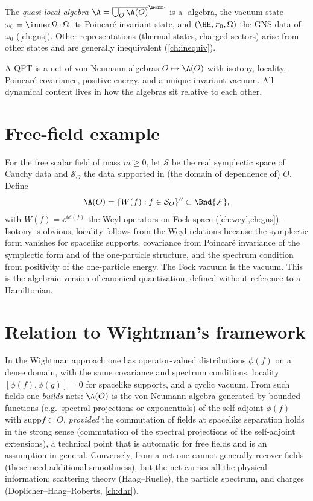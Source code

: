 The \emph{quasi-local algebra} $\A=\overline{\bigcup_O\A(O)}^{\norm\cdot}$ is a \cstar-algebra, the vacuum state $\omega_0=\inner\Omega{\,\cdot\,\Omega}$ its Poincar\'e-invariant state, and $(\HH,\pi_0,\Omega)$ the GNS data of $\omega_0$ (\cref{ch:gns}). Other representations (thermal states, charged sectors) arise from other states and are generally inequivalent (\cref{ch:inequiv}).

\begin{keyidea}
A QFT is a net of von Neumann algebras $O\mapsto\A(O)$ with isotony, locality, Poincar\'e covariance, positive energy, and a unique invariant vacuum. All dynamical content lives in how the algebras sit relative to each other.
\end{keyidea}

\section{Free-field example}

For the free scalar field of mass $m\ge0$, let $\mathcal S$ be the real symplectic space of Cauchy data and $\mathcal S_O$ the data supported in (the domain of dependence of) $O$. Define
\begin{equation}
\A(O)=\{W(f):f\in\mathcal S_O\}''\subset\Bnd{\mathcal F},
\end{equation}
with $W(f)=\ee^{\ii\phi(f)}$ the Weyl operators on Fock space (\cref{ch:weyl,ch:gns}). Isotony is obvious, locality follows from the Weyl relations because the symplectic form vanishes for spacelike supports, covariance from Poincar\'e invariance of the symplectic form and of the one-particle structure, and the spectrum condition from positivity of the one-particle energy. The Fock vacuum is the vacuum. This is the algebraic version of canonical quantization, defined without reference to a Hamiltonian.

\section{Relation to Wightman's framework}

In the Wightman approach one has operator-valued distributions $\phi(f)$ on a dense domain, with the same covariance and spectrum conditions, locality $[\phi(f),\phi(g)]=0$ for spacelike supports, and a cyclic vacuum. From such fields one \emph{builds} nets: $\A(O)$ is the von Neumann algebra generated by bounded functions (e.g.\ spectral projections or exponentials) of the self-adjoint $\phi(f)$ with $\mathrm{supp}f\subset O$, \emph{provided} the commutation of fields at spacelike separation holds in the strong sense (commutation of the spectral projections of the self-adjoint extensions), a technical point that is automatic for free fields and is an assumption in general. Conversely, from a net one cannot generally recover fields (these need additional smoothness), but the net carries all the physical information: scattering theory (Haag--Ruelle), the particle spectrum, and charges (Doplicher--Haag--Roberts, \cref{ch:dhr}).

